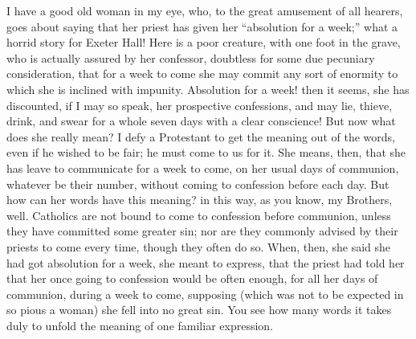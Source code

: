 I have a good old woman in my eye, who, to the great
amusement of all hearers, goes about saying that her
priest has given her ``absolution for a week;''
what a horrid story for Exeter Hall! Here is a poor
creature, with one foot in the grave, who is actually
assured by her confessor, doubtless for some due
pecuniary consideration, that for a week to come she may
commit any sort of enormity to which she is inclined with
impunity. Absolution for a week! then it seems, she has
discounted, if I may so speak, her prospective
confessions, and may lie, thieve, drink, and swear for a
whole seven days with a clear conscience! But now what
does she really mean? I defy a Protestant to get the
meaning out of the words, even if he wished to be fair;
he must come to us for it. She means, then, that she has
leave to communicate for a week to come, on her usual
days of communion, whatever be their number, without
coming to confession before each day. But how can her
words have this meaning? in this way, as you know, my
Brothers, well. Catholics are not bound to come to
confession before communion, unless they have committed
some greater sin; nor are they commonly advised by their
priests to come every time, though they often do so.
When, then, she said she had got absolution for a week,
she meant to express, that the priest had told her that
her once going to confession would be often enough, for
all her days of communion, during a week to come,
supposing (which was not to be expected in so pious a
woman) she fell into no great sin. You see how many words
it takes duly to unfold the meaning of one familiar
expression.

